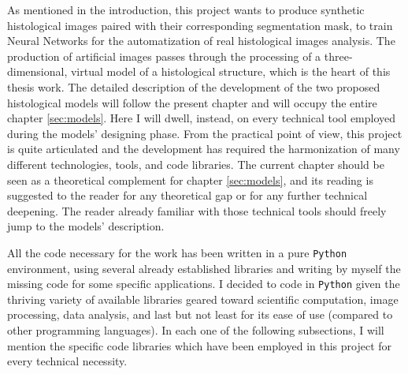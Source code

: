 As mentioned in the introduction, this project wants to produce synthetic histological images paired with their corresponding segmentation mask, to train Neural Networks for the automatization of real histological images analysis. The production of artificial images passes through the processing of a three-dimensional, virtual model of a histological structure, which is the heart of this thesis work. The detailed description of the development of the two proposed histological models will follow the present chapter and will occupy the entire chapter \ref{sec:models}. Here I will dwell, instead, on every technical tool employed during the models' designing phase. From the practical point of view, this project is quite articulated and the development has required the harmonization of many different technologies, tools, and code libraries. The current chapter should be seen as a theoretical complement for chapter \ref{sec:models}, and its reading is suggested to the reader for any theoretical gap or for any further technical deepening. The reader already familiar with those technical tools should freely jump to the models' description.

All the code necessary for the work has been written in a pure \texttt{Python} environment, using several already established libraries and writing by myself the missing code for some specific applications. I decided to code in \texttt{Python} given the thriving variety of available libraries geared toward scientific computation, image processing, data analysis, and last but not least for its ease of use (compared to other programming languages). In each one of the following subsections, I will mention the specific code libraries which have been employed in this project for every technical necessity.

